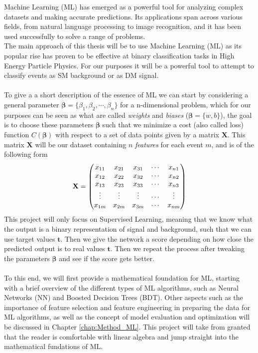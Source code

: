 \documentclass[14pt, a4paper]{book}
\begin{document}
Machine Learning (ML) has emerged as a powerful tool for analyzing complex datasets and making accurate predictions. Its applications span across various fields, from natural language processing to image recognition, and it has been used successfully to solve a range of problems. \\
The main approach of this thesis will be to use Machine Learning (ML) as its popular rise has proven to be effective at binary classification tasks \cite{Baldi_2016, DeepLearing} in High Energy Particle Physics. 
For our purposes it will be a powerful tool to attempt to classify events as SM background or as DM signal. 
\\
\\To give a a short description of the essence of ML we can start by considering a general parameter $\bm{\beta} = \{\beta_1,\beta_2,\cdots,\beta_n\}$ for a n-dimensional problem, which for our purposes can be seen as what are called \textit{weights} and \textit{biases} 
($\bm \beta = \{w, b\}$), 
the goal is to choose these parameters $\bm{\beta}$ such that we minimize a cost (also called loss) function $C(\bm{\beta})$ with respect to a set of data points given by a matrix $\mathbf{X}$. This matrix $\mathbf{X}$ will be 
our dataset containing $n$ \textit{features} for each event $m$, and is of the following form 
\begin{equation}\label{eq:dataser}
    \bf X = \begin{pmatrix}
        x_{11} & x_{21} & x_{31} & \cdots & x_{n1}\\
        x_{12} & x_{22} & x_{32} & \cdots & x_{n2}\\
        x_{13} & x_{23} & x_{33} & \cdots & x_{n3}\\
        \vdots & \vdots & \vdots & \cdots & \vdots\\
        x_{1m} & x_{2m} & x_{3m} & \cdots & x_{nm}\\  
    \end{pmatrix}    
\end{equation}
This project will only focus on Supervised Learning, meaning that we know what the output is a binary representation of signal and background, such that we can use target values $\bm{t}$. 
Then we give the network a score depending on how close the predicted output is to real values $\bm t $. Then we repeat the process after tweaking the parameters $\bm \beta $ and see if the score gets better.\\
\\To this end, we will first provide a mathematical foundation for ML, starting with a brief overview of the different types of ML algorithms, such as Neural Networks (NN) and Boosted Decision Trees (BDT). 
Other aspects such as the importance of feature selection and feature engineering in preparing the data for ML algorithms, as well as the concept of model evaluation and optimization will be discussed in Chapter \ref{chap:Method_ML}. 
This project will take from granted that the reader is comfortable with linear algebra and jump straight into the mathematical fundations of ML. \\
\end{document}

